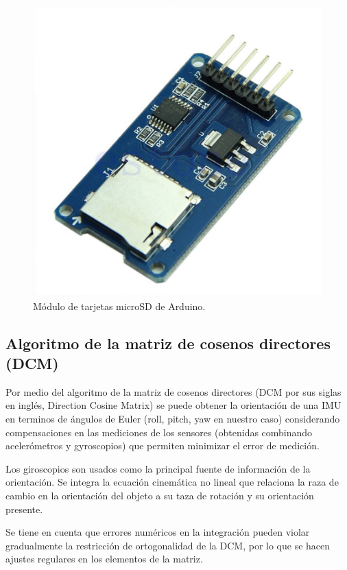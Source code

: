 		\begin{figure}[h]
		\begin{center}
		\includegraphics[scale=0.2]{imagenes/3-boomerang/SD.png}
		\caption{Módulo de tarjetas microSD de Arduino.}
		\label{fig20}
		\end{center}
		\end{figure}

	\subsection{Algoritmo de la matriz de cosenos directores (DCM)}

	Por medio del algoritmo de la matriz de cosenos directores (DCM por sus siglas en inglés, Direction Cosine Matrix) se puede obtener la orientación de una IMU en terminos de ángulos de Euler (roll, pitch, yaw en nuestro caso) considerando compensaciones en las mediciones de los sensores (obtenidas combinando acelerómetros y gyroscopios) que permiten minimizar el error de medición.

	Los giroscopios son usados como la principal fuente de información de la orientación. Se integra la ecuación cinemática no lineal que relaciona la raza de cambio en la orientación del objeto a su taza de rotación y su orientación presente.

	Se tiene en cuenta que errores numéricos en la integración pueden violar gradualmente la restricción de ortogonalidad de la DCM, por lo que se hacen ajustes regulares en los elementos de la matriz.

